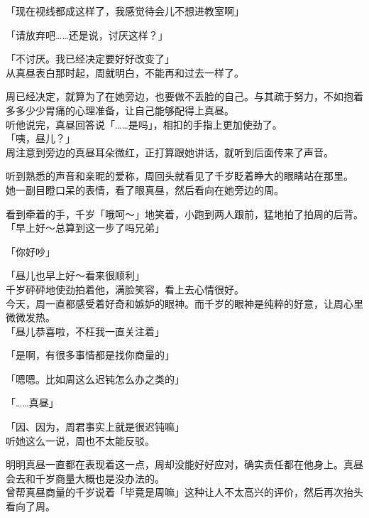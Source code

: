 「现在视线都成这样了，我感觉待会儿不想进教室啊」

「请放弃吧……还是说，讨厌这样？」

「不讨厌。我已经决定要好好改变了」\\

从真昼表白那时起，周就明白，不能再和过去一样了。

周已经决定，就算为了在她旁边，也要做不丢脸的自己。与其疏于努力，不如抱着多多少少胃痛的心理准备，让自己能够配得上真昼。\\

听他说完，真昼回答说「……是吗」，相扣的手指上更加使劲了。\\

「咦，昼儿？」\\

周注意到旁边的真昼耳朵微红，正打算跟她讲话，就听到后面传来了声音。

听到熟悉的声音和亲昵的爱称，周回头就看见了千岁眨着睁大的眼睛站在那里。\\

她一副目瞪口呆的表情，看了眼真昼，然后看向在她旁边的周。

看到牵着的手，千岁「哦呵～」地笑着，小跑到两人跟前，猛地拍了拍周的后背。\\

「早上好～总算到这一步了吗兄弟」

「你好吵」

「昼儿也早上好～看来很顺利」\\

千岁砰砰地使劲拍着他，满脸笑容，看上去心情很好。\\

今天，周一直都感受着好奇和嫉妒的眼神。而千岁的眼神是纯粹的好意，让周心里微微发热。\\

「昼儿恭喜啦，不枉我一直关注着」

「是啊，有很多事情都是找你商量的」

「嗯嗯。比如周这么迟钝怎么办之类的」

「……真昼」

「因、因为，周君事实上就是很迟钝嘛」\\

听她这么一说，周也不太能反驳。

明明真昼一直都在表现着这一点，周却没能好好应对，确实责任都在他身上。真昼会去和千岁商量大概也是没办法的。\\

曾帮真昼商量的千岁说着「毕竟是周嘛」这种让人不太高兴的评价，然后再次抬头看向了周。\\

